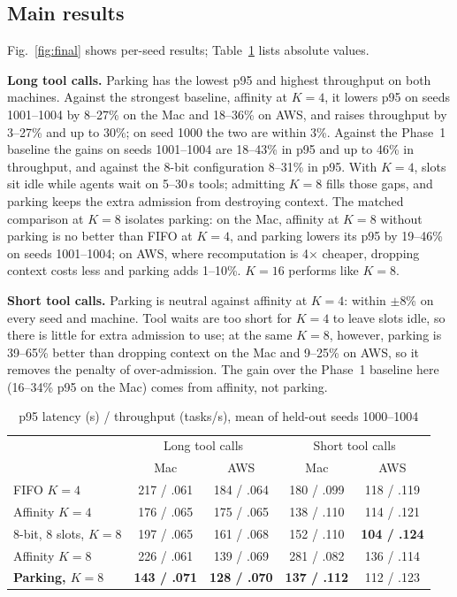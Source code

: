 \documentclass[conference,letterpaper]{IEEEtran}
\begin{document}
\subsection{Main results}
Fig.~\ref{fig:final} shows per-seed results; Table~\ref{tab:main} lists absolute values.

\textbf{Long tool calls.} Parking has the lowest p95 and highest throughput on both machines. Against the strongest baseline, affinity at $K=4$, it lowers p95 on seeds 1001--1004 by 8--27\% on the Mac and 18--36\% on AWS, and raises throughput by 3--27\% and up to 30\%; on seed 1000 the two are within 3\%. Against the Phase~1 baseline the gains on seeds 1001--1004 are 18--43\% in p95 and up to 46\% in throughput, and against the 8-bit configuration 8--31\% in p95. With $K=4$, slots sit idle while agents wait on 5--30\,s tools; admitting $K=8$ fills those gaps, and parking keeps the extra admission from destroying context. The matched comparison at $K=8$ isolates parking: on the Mac, affinity at $K=8$ without parking is no better than FIFO at $K=4$, and parking lowers its p95 by 19--46\% on seeds 1001--1004; on AWS, where recomputation is 4$\times$ cheaper, dropping context costs less and parking adds 1--10\%. $K=16$ performs like $K=8$.

\textbf{Short tool calls.} Parking is neutral against affinity at $K=4$: within $\pm$8\% on every seed and machine. Tool waits are too short for $K=4$ to leave slots idle, so there is little for extra admission to use; at the same $K=8$, however, parking is 39--65\% better than dropping context on the Mac and 9--25\% on AWS, so it removes the penalty of over-admission. The gain over the Phase~1 baseline here (16--34\% p95 on the Mac) comes from affinity, not parking.

\begin{table}[t]
\caption{p95 latency (s) / throughput (tasks/s), mean of held-out seeds 1000--1004}
\label{tab:main}
\centering\footnotesize\setlength{\tabcolsep}{3.5pt}
\begin{tabular}{@{}lcccc@{}}
\toprule
 & \multicolumn{2}{c}{Long tool calls} & \multicolumn{2}{c}{Short tool calls} \\
 & Mac & AWS & Mac & AWS \\
\midrule
FIFO $K=4$ & 217 / .061 & 184 / .064 & 180 / .099 & 118 / .119 \\
Affinity $K=4$ & 176 / .065 & 175 / .065 & 138 / .110 & 114 / .121 \\
8-bit, 8 slots, $K=8$ & 197 / .065 & 161 / .068 & 152 / .110 & \textbf{104 / .124} \\
Affinity $K=8$ & 226 / .061 & 139 / .069 & 281 / .082 & 136 / .114 \\
\textbf{Parking, $K=8$} & \textbf{143 / .071} & \textbf{128 / .070} & \textbf{137 / .112} & 112 / .123 \\
\bottomrule
\end{tabular}
\end{table}
\end{document}
